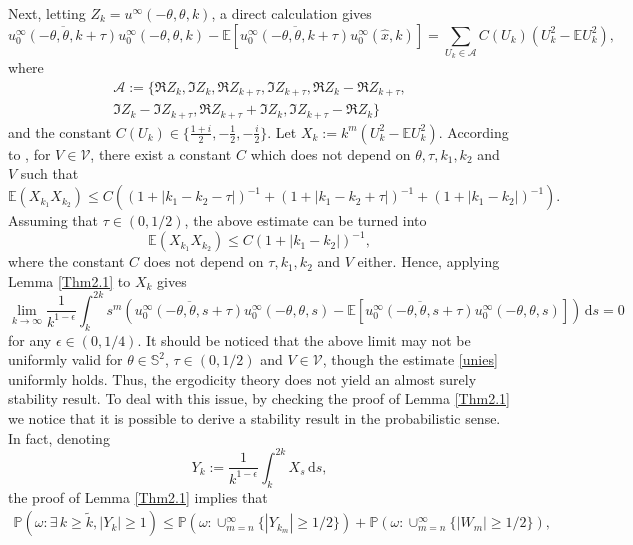 \documentclass[reqno, 12pt]{amsart}
\numberwithin{equation}{section}
\begin{document}
Next,
letting $
Z_k=u^\infty(-\theta,\theta, k)$, a direct calculation gives \begin{equation}\label{3.4}
	\overline{u_0^\infty(-\theta,\theta, k+\tau)} u_0^\infty(-\theta,\theta, k)-\mathbb{E}[\overline{u_0^\infty(-\theta,\theta, k+\tau) }u_0^\infty(\hat{x}, k)]= \sum_{U_k \in \mathcal{A}} C(U_k) (U_k^2-\mathbb E U_k^2),
\end{equation} where \begin{align*} \mathcal{A}:=\{\Re Z_k, \Im Z_k, \Re Z_{k+\tau}, \Im Z_{k+\tau},  \Re Z_k-\Re Z_{k+\tau}, \\ \Im Z_k-\Im Z_{k+\tau},\Re Z_{k+\tau}+ \Im Z_k, \Im Z_{k+\tau}-\Re Z_k\}\end{align*} and the constant $C(U_k) \in \{ \frac{1+i}{2},-\frac{1}{2},-\frac{i}{2}\}$.
Let $X_k:=k^{m} (U_k^2-\mathbb E U_k^2)$. According to \cite[Lemma 3.4]{li2022far}, for $V \in \mathcal V$, there exist a constant $C$ which does not depend on $\theta,\tau, k_1,k_2$ and $V$ such that \[
\mathbb{E}(X_{k_1} X_{k_2}) \le C \left((1+|k_1-k_2-\tau|)^{-1}+(1+|k_1-k_2+\tau|)^{-1}+(1+|k_1-k_2|)^{-1} \right).\]  Assuming that $\tau \in (0,1/2)$, 
the above estimate can be turned into \begin{equation}\label{unies}
\mathbb{E}(X_{k_1} X_{k_2}) \le C (1+|k_1-k_2|)^{-1} ,
\end{equation} where the constant $C$ does not depend on $\tau, k_1,k_2$ and $V$ either. Hence, applying Lemma \ref{Thm2.1} to $X_k$ gives 
\begin{equation*}
	\lim_{k \to \infty}\frac{1}{k^{1-\epsilon}}\int_k^{2k}s^{m}(\overline{u_0^\infty(-\theta,\theta, s+\tau)} u_0^\infty(-\theta,\theta, s)-\mathbb{E}[\overline{u_0^\infty(-\theta,\theta, s+\tau)} u_0^\infty(-\theta,\theta,s)])\,\mathrm{d}s=0
	\end{equation*} for any $\epsilon \in (0,1/4).$ It should be noticed that the above limit may not be uniformly valid for $\theta \in \mathbb S^2$, $\tau \in (0,1/2)$ and $V \in \mathcal V$, though the estimate \eqref{unies} uniformly holds. Thus, the ergodicity theory
	does not yield an almost surely stability result. To deal with this issue, by checking the proof of Lemma \ref{Thm2.1} we notice that it is possible to 
	derive a stability result in the probabilistic sense. In fact, denoting 
	\[Y_k:=\frac{1}{k^{1-\epsilon}}\int_k^{2k} X_s \,\mathrm{d}s,\]
	the proof of Lemma \ref{Thm2.1} implies that 
	\begin{align}\label{ps}
	\mathbb P(\omega: \exists \,  k \ge \tilde k, |Y_{ k}| \ge 1) \le \mathbb P(\omega: \cup_{m=n}^\infty\{|Y_{k_m}| \ge 1/2\})+\mathbb P(\omega: \cup_{m=n}^\infty\{|{W_m}| \ge 1/2\}),
\end{align} 
\end{document}
